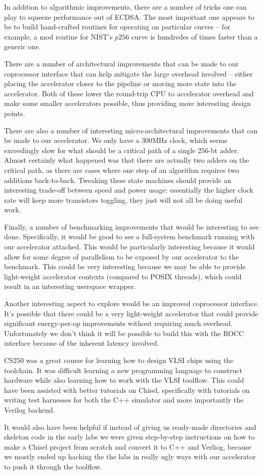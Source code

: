 \documentclass[twocolumn]{article}
\begin{document}
In addition to algorithmic improvements, there are a number of tricks
one can play to squeeze performance out of ECDSA.  The most important
one appears to be to build hand-crafted routines for operating on
particular curves -- for example, a mod routine for NIST's $p256$
curve is hundredes of times faster than a generic
one.

There are a number of architectural improvements that can be made to
our coprocessor interface that can help mitigate the large overhead
involved -- either placing the accelerator closer to the pipeline or
moving more state into the accelerator.  Both of these lower the
round-trip CPU to accelerator overhead and make some smaller
accelerators possible, thus providing more interesting design points.

There are also a number of interesting micro-architectural
improvements that can be made to our accelerator.  We only have a
300MHz clock, which seems exceedingly slow for what should be a
critical path of a single 256-bt adder.  Almost certainly what
happened was that there are actually two adders on the critical path,
as there are cases where one step of an algorithm requires two
additions back-to-back.  Tweaking these state machines should provide
an interesting trade-off between speed and power usage: essentially
the higher clock rate will keep more transistors toggling, they just
will not all be doing useful work.

Finally, a number of benchmarking improvements that would be
interesting to see done.  Specifically, it would be good to see a
full-system benchmark running with our accelerator attached.  This
would be particularly interesting because it would allow for some
degree of parallelism to be exposed by our accelerator to the
benchmark.  This could be very interesting because we may be able to
provide light-weight accelerator contexts (compared to POSIX threads),
which could result in an interesting userspace wrapper.

Another interesting aspect to explore would be an improved coprocessor
interface.  It's possible that there could be a very light-weight
accelerator that could provide significant energy-per-op improvements
without requiring much overhead.  Unfortunately we don't think it will
be possible to build this with the ROCC interface because of the
inherent latency involved.

CS250 was a great course for learning how to design VLSI chips using
the toolchain. It was difficult learning a new programming language to
construct hardware while also learning how to work with the VLSI
toolflow. This could have been assisted with better tutorials on
Chisel, specifically with tutorials on writing test harnesses for both the C++
simulator and more importantly the Verilog backend.

It would also have been helpful if instead of giving us ready-made
directories and skeleton code in the early labs we were given
step-by-step instructions on how to make a Chisel project from scratch
and convert it to C++ and Verliog, because we mostly ended up hacking
the the labs in really ugly ways with our accelerator to push it
through the toolflow.



\end{document}
